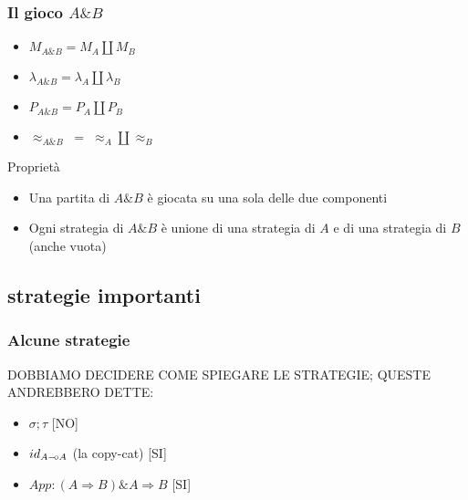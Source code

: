 \documentclass{beamer}
\newcommand{\limp}{\mathbin{{-}\mkern-3.5mu{\circ}}}
\begin{document}
\begin{frame}
{

	}
	
	
\end{frame}


\begin{frame}
	
	\frametitle{Il gioco $A \& B$}
	
	\begin{itemize}
		\item $M_{A\& B}=M_A \coprod M_B$
		\item $\lambda_{A\& B}=\lambda_A \coprod \lambda_B$
		\item $P_{A\& B}=P_A \coprod P_B$
		\item $\approx_{A\& B} \; = \; \approx_A \coprod \approx_B$ 
	\end{itemize}
	
	\begin{block}{Proprietà}
		\begin{itemize}
			\item Una partita di $A\& B$ è giocata su una sola delle due componenti
			\item Ogni strategia di $A\& B$ è unione di una strategia di $A$ e di una strategia di $B$ (anche vuota)
		\end{itemize}
		
	\end{block}
	
\end{frame}


\begin{frame}[t]
\end{frame}


\subsection{strategie importanti}

\begin{frame}

	\frametitle{Alcune strategie}
	
	DOBBIAMO DECIDERE COME SPIEGARE LE STRATEGIE; QUESTE ANDREBBERO DETTE:
	\begin{itemize}
		\item $\sigma ; \tau$ [NO]
		\item $id_{A\limp A}$ (la copy-cat) [SI]
		\item $App:(A \Rightarrow B)\& A \Rightarrow B$ [SI]
	\end{itemize}

\end{frame}
\end{document}
